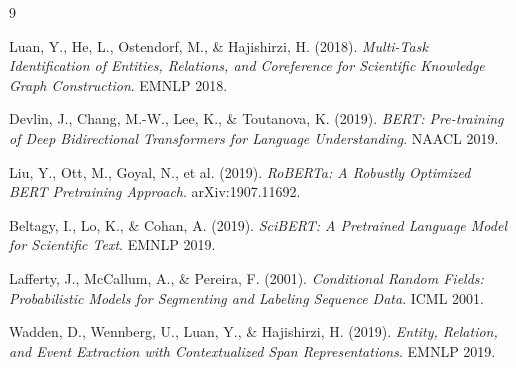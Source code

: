 \begin{thebibliography}{9}

Luan, Y., He, L., Ostendorf, M., \& Hajishirzi, H. (2018).
\textit{Multi-Task Identification of Entities, Relations, and Coreference for Scientific Knowledge Graph Construction}.
EMNLP 2018.

Devlin, J., Chang, M.-W., Lee, K., \& Toutanova, K. (2019).
\textit{BERT: Pre-training of Deep Bidirectional Transformers for Language Understanding}.
NAACL 2019.

Liu, Y., Ott, M., Goyal, N., et al. (2019).
\textit{RoBERTa: A Robustly Optimized BERT Pretraining Approach}.
arXiv:1907.11692.

Beltagy, I., Lo, K., \& Cohan, A. (2019).
\textit{SciBERT: A Pretrained Language Model for Scientific Text}.
EMNLP 2019.

Lafferty, J., McCallum, A., \& Pereira, F. (2001).
\textit{Conditional Random Fields: Probabilistic Models for Segmenting and Labeling Sequence Data}.
ICML 2001.

Wadden, D., Wennberg, U., Luan, Y., \& Hajishirzi, H. (2019).
\textit{Entity, Relation, and Event Extraction with Contextualized Span Representations}.
EMNLP 2019.

\end{thebibliography}
